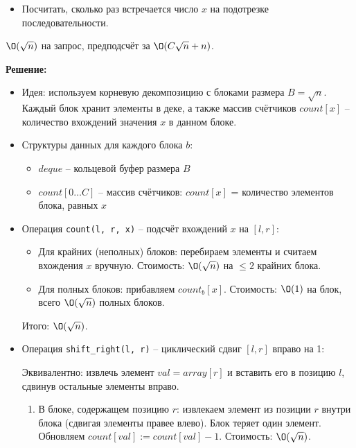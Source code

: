 \begin{enumerate}
\begin{itemize}
        \item Посчитать, сколько раз встречается число $x$ на подотрезке последовательности.
    \end{itemize}
    $\O(\sqrt{n})$ на запрос, предподсчёт за $\O(C\sqrt{n} + n)$.

    \textbf{Решение:}

    \begin{itemize}

      \item Идея: используем корневую декомпозицию с блоками размера $B = \sqrt{n}$.
      Каждый блок хранит элементы в деке, а также массив счётчиков $count[x]$ -- количество вхождений значения $x$ в данном блоке.

      \item Структуры данных для каждого блока $b$:
      \begin{itemize}
        \item $deque$ -- кольцевой буфер размера $B$

        \item $count[0 \ldots C]$ -- массив счётчиков: $count[x]$ = количество элементов блока, равных $x$
      \end{itemize}

      \item Операция \texttt{count(l, r, x)} -- подсчёт вхождений $x$ на $[l, r]$:
      \begin{itemize}
        \item Для крайних (неполных) блоков: перебираем элементы и считаем вхождения $x$ вручную.
        Стоимость: $\O(\sqrt{n})$ на $\leq 2$ крайних блока.

        \item Для полных блоков: прибавляем $count_b[x]$. Стоимость: $\O(1)$ на блок, всего $\O(\sqrt{n})$ полных блоков.
      \end{itemize}
      Итого: $\O(\sqrt{n})$.

      \item Операция \texttt{shift\_right(l, r)} -- циклический сдвиг $[l, r]$ вправо на 1:

      Эквивалентно: извлечь элемент $val = array[r]$ и вставить его в позицию $l$, сдвинув остальные элементы вправо.

      \begin{enumerate}
        \item В блоке, содержащем позицию $r$: извлекаем элемент из позиции $r$ внутри блока (сдвигая элементы правее влево).
        Блок теряет один элемент. Обновляем $count[val] := count[val] - 1$. Стоимость: $\O(\sqrt{n})$.


\end{enumerate}
\end{itemize}
\end{enumerate}
